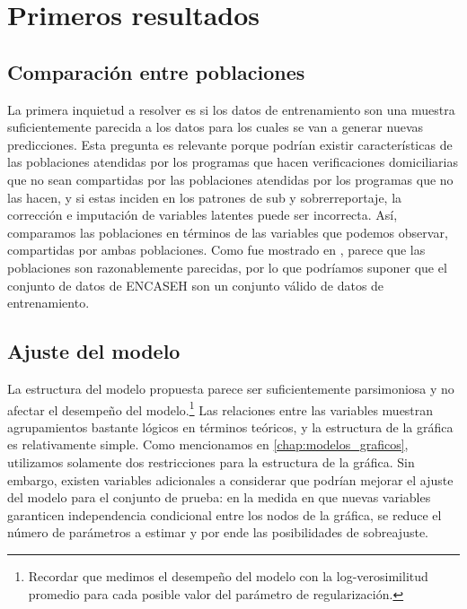 \chapter{Primeros resultados}
\label{chap:primeros_resultados}
\section*{Comparación entre poblaciones}
La primera inquietud a resolver es si los datos de entrenamiento son una muestra suficientemente parecida a los datos para los cuales se van a generar nuevas predicciones. Esta pregunta es relevante porque podrían existir características de las poblaciones atendidas por los programas que hacen verificaciones domiciliarias que no sean compartidas por las poblaciones atendidas por los programas que no las hacen, y si estas inciden en los patrones de sub y sobrerreportaje, la corrección e imputación de variables latentes puede ser incorrecta. Así, comparamos las poblaciones en términos de las variables que podemos observar, compartidas por ambas poblaciones. Como fue mostrado en \cite{lfgp_entregable_1}, parece que las poblaciones son razonablemente parecidas, por lo que podríamos suponer que el conjunto de datos de ENCASEH son un conjunto válido de datos de entrenamiento.
\section*{Ajuste del modelo}
La estructura del modelo propuesta parece ser suficientemente parsimoniosa y no afectar el desempeño del modelo.\footnote{Recordar que medimos el desempeño del modelo con la log-verosimilitud promedio para cada posible valor del parámetro de regularización.} Las relaciones entre las variables muestran agrupamientos bastante lógicos en términos teóricos, y la estructura de la gráfica es relativamente simple. Como mencionamos en \autoref{chap:modelos_graficos}, utilizamos solamente dos restricciones para la estructura de la gráfica. Sin embargo, existen variables adicionales a considerar que podrían mejorar el ajuste del modelo para el conjunto de prueba: en la medida en que nuevas variables garanticen independencia condicional entre los nodos de la gráfica, se reduce el número de parámetros a estimar y por ende las posibilidades de sobreajuste.

